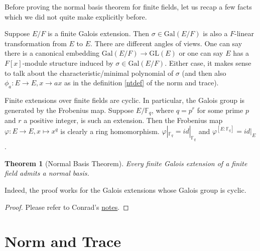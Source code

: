 \documentclass[12pt]{report}
\newtheorem{theorem}{Theorem}[section]
\theoremstyle{definition}
\newtheorem{example}[theorem]{Example}
\newcommand{\gal}{\text{Gal}}
\newcommand{\zz}{\mathbb{Z}}
\newcommand{\ff}{\mathbb{F}}
\newcommand{\qq}{\mathbb{Q}}
\begin{document}
Before proving the normal basis theorem for finite fields, let us recap a few facts which we did not quite make explicitly before.

Suppose $E/F$ is a finite Galois extension. Then $\sigma\in\gal(E/F)$ is also a $F$-linear transformation from $E$ to $E$. There are different angles of views. One can say there is a canonical embedding $\gal(E/F)\to \mbox{GL}(E)$ or one can say $E$ has a $F[x]$-module structure induced by $\sigma\in \gal(E/F)$. Either case, it makes sense to talk about the characteristic/minimal polynomial of $\sigma$ (and then also $\phi_a: E\to E, x\to ax$ as in the definition \ref{ntdef} of the norm and trace).

Finite extensions over finite fields are cyclic. In particular, the Galois group is generated by the Frobenius map. Suppose $E/\ff_q$, where $q=p^r$ for some prime $p$ and $r$ a positive integer, is such an extension. Then the Frobenius map $\varphi: E\to E, x\mapsto x^q$ is clearly a ring homomorphism. $\varphi|_{\ff_q}=id|_{\ff_q}$ and $\varphi^{[E:\ff_{q}]}=id|_{E}$.

\begin{theorem}[Normal Basis Theorem]
	Every finite Galois extension of a finite field admits a normal basis.
\end{theorem}

Indeed, the proof works for the Galois extensions whose Galois group is cyclic.

\begin{proof}
	Please refer to Conrad's \href{https://kconrad.math.uconn.edu/blurbs/galoistheory/linearchar.pdf}{notes}.
\end{proof}


\section{Norm and Trace}
\end{document}
